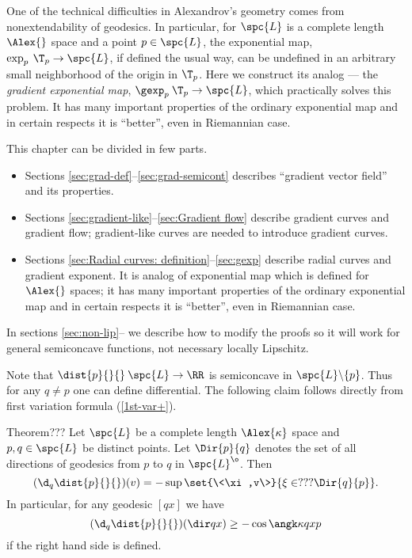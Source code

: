 One of the technical difficulties in Alexandrov's geometry comes from
nonextendability of geodesics. 
In particular, for $\spc{L}$ is a complete length $\Alex{}$ space and a point $p\in \spc{L}$, 
the exponential map, $\exp_p\:\T_p\to \spc{L}$, if defined the usual way, can
be undefined in an arbitrary small neighborhood of the origin in $\T_p$. 
Here we construct its analog --- the \emph{gradient exponential map},
$\gexp_p\:\T_p\to\spc{L}$, 
which practically solves this problem. 
It has many important properties of the ordinary exponential map
and in certain respects it is ``better'',
even in Riemannian case.


















This chapter can be divided in few parts. 
\begin{itemize}
\item Sections \ref{sec:grad-def}--\ref{sec:grad-semicont} 
describes ``gradient vector field'' and its properties.
\item Sections \ref{sec:gradient-like}--\ref{sec:Gradient flow} describe gradient curves and gradient flow;
gradient-like curves are needed to introduce gradient curves.
\item Sections \ref{sec:Radial curves: definition}--\ref{sec:gexp} describe radial curves and gradient exponent. 
It is analog of exponential map which is defined for $\Alex{}$ spaces; it has many important properties of the ordinary exponential map
and in certain respects it is ``better'',
even in Riemannian case.
\end{itemize}


In sections \ref{sec:non-lip}-- we describe how to 
modify the proofs so it will work for general semiconcave functions, 
not necessary locally Lipschitz.






Note that $\dist{p}{}{}\:\spc{L}\to\RR$ is semiconcave in $\spc{L}\backslash\{p\}$.
Thus for any $q\not=p$ one can define differential.
The following claim follows directly from first variation formula (\ref{1st-var+}).

\begin{thm}{Theorem???}\label{thm:differential-of-dist}
Let $\spc{L}$ be a complete length $\Alex{\kappa}$ space
and $p,q\in \spc{L}$ be distinct points. 
Let $\Dir{p}{q}$ denotes the set of all directions of geodesics from $p$ to $q$ in $\spc{L}^\o$.
Then 
\[(\d_q\dist{p}{}{})(v)=-\sup\set{\<\xi,v\>}{\xi\in???\Dir{q}{p}}.\]
In particular, for any geodesic $[qx]$ we have
\[(\d_q\dist{p}{}{})(\dir qx)\ge -\cos\angk\kappa qxp\]
if the right hand side is defined.
\end{thm}


